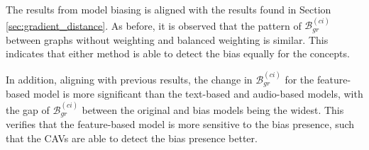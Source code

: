 
The results from model biasing is aligned with the results found in Section \ref{sec:gradient_distance}. As before, it is observed that the pattern of $\mathcal{B}^{(ci)}_{gr}$ between graphs without weighting and balanced weighting is similar. This indicates that either method is able to detect the bias equally for the concepts.

In addition, aligning with previous results, the change in $\mathcal{B}^{(ci)}_{gr}$ for the feature-based model is more significant than the text-based and audio-based models, with the gap of $\mathcal{B}^{(ci)}_{gr}$ between the original and bias models being the widest. This verifies that the feature-based model is more sensitive to the bias presence, such that the CAVs are able to detect the bias presence better.

